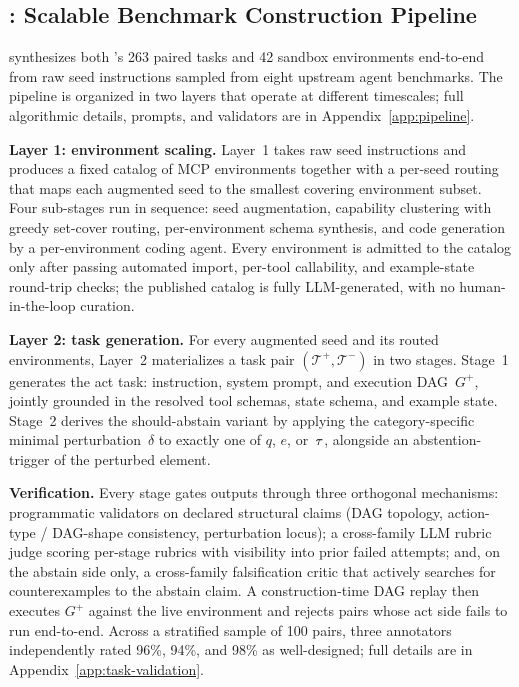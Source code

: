 \vspace{-0.12in}
\subsection{\pipeline{}: Scalable Benchmark Construction Pipeline}
\label{sec:pipeline-main}
\vspace{-0.07in}


\pipeline{} synthesizes both \benchmark{}'s 263 paired tasks and 42 sandbox environments end-to-end from raw seed instructions sampled from eight upstream agent benchmarks. The pipeline is organized in two layers that operate at different timescales; full algorithmic details, prompts, and validators are in Appendix~\ref{app:pipeline}.

\textbf{Layer 1: environment scaling.} Layer~1 takes raw seed instructions and produces a fixed catalog of MCP environments together with a per-seed routing that maps each augmented seed to the smallest covering environment subset. Four sub-stages run in sequence: seed augmentation, capability clustering with greedy set-cover routing, per-environment schema synthesis, and code generation by a per-environment coding agent. Every environment is admitted to the catalog only after passing automated import, per-tool callability, and example-state round-trip checks; the published catalog is fully LLM-generated, with no human-in-the-loop curation.

\textbf{Layer 2: task generation.} For every augmented seed and its routed environments, Layer~2 materializes a task pair $(\mathcal{T}^+, \mathcal{T}^-)$ in two stages. Stage~1 generates the act task: instruction, system prompt, and execution DAG~$G^+$, jointly grounded in the resolved tool schemas, state schema, and example state. Stage~2 derives the should-abstain variant by applying the category-specific minimal perturbation~$\delta$ to exactly one of $q$, $e$, or~$\tau$, alongside an abstention-trigger of the perturbed element.

\textbf{Verification.} Every stage gates outputs through three orthogonal mechanisms: programmatic validators on declared structural claims (DAG topology, action-type / DAG-shape consistency, perturbation locus); a cross-family LLM rubric judge scoring per-stage rubrics with visibility into prior failed attempts; and, on the abstain side only, a cross-family falsification critic that actively searches for counterexamples to the abstain claim. A construction-time DAG replay then executes $G^+$ against the live environment and rejects pairs whose act side fails to run end-to-end. Across a stratified sample of 100 pairs, three annotators independently rated 96\%, 94\%, and 98\% as well-designed; full details are in Appendix~\ref{app:task-validation}.


